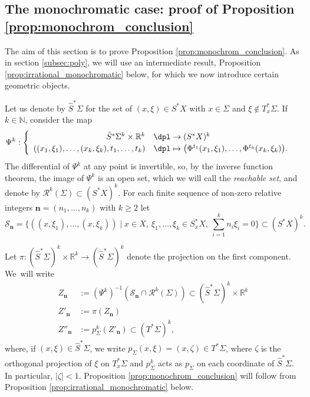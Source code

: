\documentclass[JEP,XML,SOM,Unicode,published]{cedram}
\let\mathcal\mathscr
\newcommand\mto{\mathchoice{\longmapsto}{\mapsto}{\mapsto}{\mapsto}}
\let\sep\mid
\theoremstyle{plain}
\theoremstyle{definition}
\newcommand{\N}{\mathbb{N}}
\newcommand{\R}{\mathbb{R}}
\def\calS{\mathcal{S}}
\begin{document}
\subsection{The monochromatic case: proof of Proposition \ref{prop:monochrom_conclusion}}\label{subsec:mono}

The aim of this section is to prove Proposition \ref{prop:monochrom_conclusion}. As in section \ref{subsec:poly}, we will use an intermediate result, Proposition \ref{prop:irrational_monochromatic} below, for which we now introduce certain geometric objects.

Let us denote by $\hat S^*\Sigma$ for the set of $(x,\xi)\in S^*X$ with $x\in \Sigma$ and $\xi\notin T_x^*\Sigma$. If~$k\in \N$, consider the map
\[
\Psi^k : \begin{cases} \begin{array}{rl}
\hat{S}^*\Sigma^k \times \R^k &\dpl\to (S^*X)^k\\
((x_1,\xi_1),\dots, (x_k, \xi_k),t_1,\dots,t_k) &\dpl\mto \bigl(\Phi^{t_1}(x_1,\xi_1),\dots, \Phi^{t_k}(x_k,\xi_k)\bigr).
\end{array}
\end{cases}
\]
The differential of $\Psi^k$ at any point is invertible, so, by the inverse function theorem, the image of $\Psi^k$ is an open set, which we will call the \emph{reachable set}, and denote by $\mathcal{R}^k(\Sigma)\subset (S^*X)^k$. For each finite sequence of non-zero relative integers $\boldsymbol{n}=(n_1,\dots,n_k)$ with $k\geq 2$ let
\[
\calS_{\boldsymbol{n}}=\bigl\{((x,\xi_1),\dots,(x,\xi_k))\sep x\in X,\ \xi_1,\dots,\xi_k\in S^*_xX,\ \textstyle\sum_{i=1}^k n_i\xi_i=0\bigr\}\subset (S^*X)^k.
\]

Let $\pi : (\hat{S}^*\Sigma)^k \times \R^k \to (\hat{S}^*\Sigma)^k$ denote the projection on the first component.
We~will write
\begin{align*}
Z_{\boldsymbol{n}} &:= (\Psi^k)^{-1} \left(\calS_{\boldsymbol{n}} \cap \mathcal{R}^k(\Sigma) \right)\subset (\hat{S}^*\Sigma)^k \times \R^k \\
Z'_{\boldsymbol{n}} &:= \pi(Z_{\boldsymbol{n}})\\
Z''_{\boldsymbol{n}} &:=p_\Sigma^k (Z'_{\boldsymbol{n}}) \subset (T^*\Sigma)^k,
\end{align*}
where, if $(x,\xi)\in \hat{S}^*\Sigma$, we write $p_\Sigma(x,\xi) = (x,\zeta)\in T^*\Sigma$, where $\zeta$ is the orthogonal projection of $\xi$ on $T_x^*\Sigma$ and $p_\Sigma^k$ acts as $p_\Sigma$ on each coordinate of $\hat{S}^*\Sigma$. In particular, $|\zeta|<1$. Proposition \ref{prop:monochrom_conclusion} will follow from Proposition \ref{prop:irrational_monochromatic} below.
\end{document}
